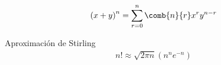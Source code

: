 {}
\begin{thm}
 \begin{align}
  \label{1.32}
  \left( x+y \right)^{n} = \sum_{r=0}^{n}\comb{n}{r}x^{r}y^{n-r}
 \end{align}

\end{thm}


{Aproximación de Stirling}
\begin{align}
 \label{1.33}
 n! \approx \sqrt{2\pi n}\left( n^{n}e^{-n} \right)
\end{align}


% 
% 
%
% 
%
% 
% 
%

